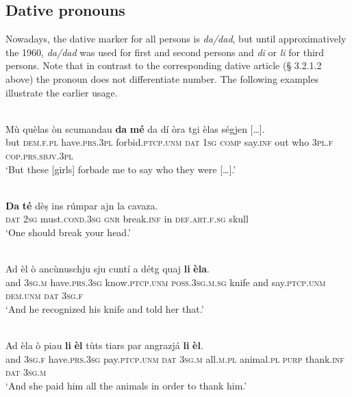 \subsection{Dative pronouns}
Nowadays, the dative marker for all persons is \textit{da/dad}, but until approximatively the 1960, \textit{da/dad} was used for first and second persons and \textit{di} or \textit{li} for third persons. Note that in contrast to the corresponding dative article (§ 3.2.1.2 above) the pronoun does not differentiate number. The following examples illustrate the earlier usage. 

\ea\label{}
\\
\gll    Mù quèlas òn scumandau \textbf{da} \textbf{mé} da dí òra tgi èlas ségjen […].\\
     but \textsc{dem.f.pl} have.\textsc{prs.3pl} forbid.\textsc{ptcp.unm} \textsc{dat} \textsc{1sg} \textsc{comp} say.\textsc{inf} out who \textsc{3pl.f} \textsc{cop.prs.sbjv.3pl} \\
\glt `But these [girls] forbade me to say who they were […].'
\z

\ea\label{}
\\
\gll   \textbf{Da} \textbf{té} dèṣ ins rúmpar ajn la cavaza.\\
\textsc{dat} \textsc{2sg} must.\textsc{cond.3sg} \textsc{gnr} break.\textsc{inf} in \textsc{def.art.f.sg} skull\\
\glt `One should break your head.'
\z

\ea\label{}
\\
\gll  Ad èl ò ancùnuschju sju cuntí a détg quaj \textbf{li} \textbf{èla}. \\
 and 3\textsc{sg.m} have.\textsc{prs.3sg} know.\textsc{ptcp.unm}  \textsc{poss.3sg.m.sg} knife and say.\textsc{ptcp.unm} \textsc{dem.unm} \textsc{dat} \textsc{3sg.f}\\
\glt `And he recognized his knife and told her that.'
\z
 
\ea\label{}
\\
\gll  Ad èla ò piau \textbf{li} \textbf{èl} tùts tiars par angrazjá \textbf{li} \textbf{èl}.\\
     and 3\textsc{sg}.\textsc{f} have.\textsc{prs}.3\textsc{sg} pay.\textsc{ptcp.unm} \textsc{dat} 3\textsc{sg}.\textsc{m} all.\textsc{m}.\textsc{pl} animal.\textsc{pl} \textsc{purp} thank.\textsc{inf} \textsc{dat} 3\textsc{sg}.\textsc{m}\\
\glt `And she paid him all the animals in order to thank him.'
\z

